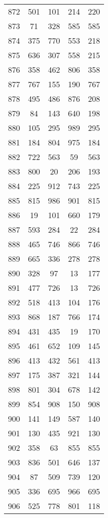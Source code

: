 \documentclass[a4paper,10pt,ngerman]{scrartcl}
\begin{document}
\begin{longtable}[c]{c|c|c|c|c}
    872 & 501 & 101 & 214 & 220 \\
    873 & 71 & 328 & 585 & 585 \\
    874 & 375 & 770 & 553 & 218 \\
    875 & 636 & 307 & 558 & 215 \\
    876 & 358 & 462 & 806 & 358 \\
    877 & 767 & 155 & 190 & 767 \\
    878 & 495 & 486 & 876 & 208 \\
    879 & 84 & 143 & 640 & 198 \\
    880 & 105 & 295 & 989 & 295 \\
    881 & 184 & 804 & 975 & 184 \\
    882 & 722 & 563 & 59 & 563 \\
    883 & 800 & 20 & 206 & 193 \\
    884 & 225 & 912 & 743 & 225 \\
    885 & 815 & 986 & 901 & 815 \\
    886 & 19 & 101 & 660 & 179 \\
    887 & 593 & 284 & 22 & 284 \\
    888 & 465 & 746 & 866 & 746 \\
    889 & 665 & 336 & 278 & 278 \\
    890 & 328 & 97 & 13 & 177 \\
    891 & 477 & 726 & 13 & 726 \\
    892 & 518 & 413 & 104 & 176 \\
    893 & 868 & 187 & 766 & 174 \\
    894 & 431 & 435 & 19 & 170 \\
    895 & 461 & 652 & 109 & 145 \\
    896 & 413 & 432 & 561 & 413 \\
    897 & 175 & 387 & 321 & 144 \\
    898 & 801 & 304 & 678 & 142 \\
    899 & 854 & 908 & 150 & 908 \\
    900 & 141 & 149 & 587 & 140 \\
    901 & 130 & 435 & 921 & 130 \\
    902 & 358 & 63 & 855 & 855 \\
    903 & 836 & 501 & 646 & 137 \\
    904 & 87 & 509 & 739 & 120 \\
    905 & 336 & 695 & 966 & 695 \\
    906 & 525 & 778 & 801 & 118 \\

\end{longtable}
\end{document}
